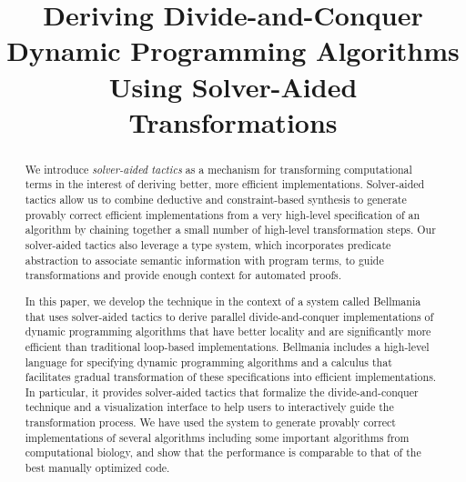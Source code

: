 \documentclass[pldi,preprint]{sigplanconf-pldi16}
\newcommand\newterm[1]{{\it #1}}
\begin{document}
\setlength{\pdfpageheight}{\paperheight}
\setlength{\pdfpagewidth}{\paperwidth}



\title{Deriving Divide-and-Conquer Dynamic Programming Algorithms Using 
  Solver-Aided Transformations}

           {}
           {}

\maketitle

\begin{abstract}
We introduce \newterm{solver-aided tactics} as a mechanism for transforming
computational terms 
in the interest of deriving better, more efficient
implementations. 
Solver-aided tactics allow us to combine deductive and constraint-based synthesis to generate provably correct efficient implementations from a very high-level specification of an algorithm by chaining together a small number of high-level transformation steps. Our solver-aided tactics also leverage a type system, which incorporates predicate abstraction to associate semantic information with program terms, to guide transformations and provide enough context for automated proofs. 


In this paper, we develop the technique in the context of a system called Bellmania that uses solver-aided tactics to derive parallel divide-and-conquer implementations of dynamic programming algorithms that have better locality and are significantly more efficient than traditional loop-based implementations. Bellmania includes a high-level language for specifying dynamic programming algorithms and a calculus that facilitates gradual transformation of these specifications into efficient implementations. In particular, it provides solver-aided tactics that formalize the divide-and-conquer technique and a visualization interface to help users to interactively guide the transformation process. 
We have used the system to generate provably correct implementations of several algorithms including some important algorithms from computational biology, and show that the performance is comparable to that of the best manually optimized code.
\end{abstract}
\end{document}
